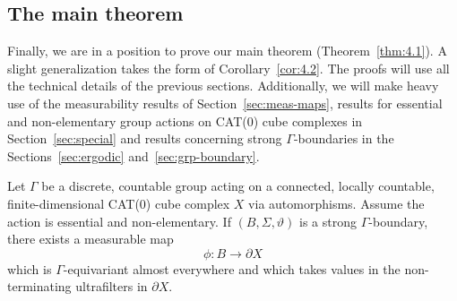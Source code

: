 \subsection{The main theorem}
\label{sec:main-proof}

Finally, we are in a position to prove our main theorem (Theorem~\ref{thm:4.1}). A slight generalization takes the form of Corollary~\ref{cor:4.2}. The proofs will use all the technical details of the previous sections. Additionally, we will make heavy use of the measurability results of Section~\ref{sec:meas-maps}, results for essential and non-elementary group actions on CAT(0) cube complexes in Section~\ref{sec:special} and results concerning strong \(\Gamma\)-boundaries in the Sections~\ref{sec:ergodic} and~\ref{sec:grp-boundary}.

\begin{thm}[{\cite[Theorem~4.1]{MR3509968}}]
  \label{thm:4.1}
  Let \(\Gamma\) be a discrete, countable group acting on a connected, locally countable, finite-dimensional CAT(0) cube complex \(X\) via automorphisms. Assume the action is essential and non-elementary. If \((B, \Sigma, \vartheta)\) is a strong \(\Gamma\)-boundary, there exists a measurable map
  \[
    \phi\colon B \to \partial X
  \]
  which is \(\Gamma\)-equivariant almost everywhere and which takes values in the non-terminating ultrafilters in \(\partial X\).
\end{thm}

